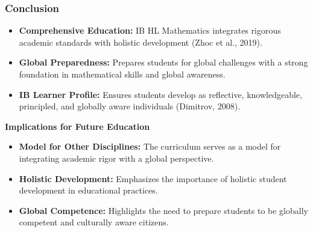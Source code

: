 \documentclass{beamer}
\begin{document}
\begin{frame}
  \frametitle{Conclusion}
  \begin{itemize}
      \item \textbf{Comprehensive Education:} IB HL Mathematics integrates rigorous academic standards with holistic development (Zhoc et al., 2019).
      \item \textbf{Global Preparedness:} Prepares students for global challenges with a strong foundation in mathematical skills and global awareness.
      \item \textbf{IB Learner Profile:} Ensures students develop as reflective, knowledgeable, principled, and globally aware individuals (Dimitrov, 2008).
  \end{itemize}
  \vspace{0.3cm}
  \textbf{Implications for Future Education}
  \begin{itemize}
      \item \textbf{Model for Other Disciplines:} The curriculum serves as a model for integrating academic rigor with a global perspective.
      \item \textbf{Holistic Development:} Emphasizes the importance of holistic student development in educational practices.
      \item \textbf{Global Competence:} Highlights the need to prepare students to be globally competent and culturally aware citizens.
  \end{itemize}
  \vspace{0.3cm}
  
\end{frame}
\end{document}
